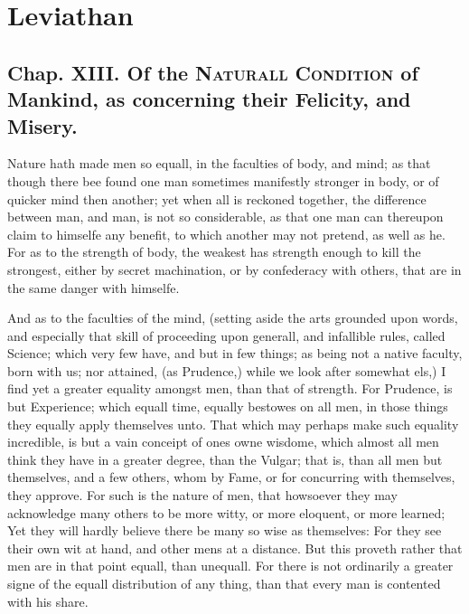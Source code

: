 
\author{Thomas Hobbes}
\chapter[Leviathan, chaps. 13 and 17]{Leviathan}

\section{Chap. XIII. Of the \textsc{Naturall Condition} of
Mankind, as concerning their Felicity, and Misery.}

Nature hath made men so equall, in the faculties of body, and mind; as
that though there bee found one man sometimes manifestly stronger in
body, or of quicker mind then another; yet when all is reckoned
together, the difference between man, and man, is not so considerable,
as that one man can thereupon claim to himselfe any benefit, to which
another may not pretend, as well as he. For as to the strength of
body, the weakest has strength enough to kill the strongest, either by
secret machination, or by confederacy with others, that are in the
same danger with himselfe.

And as to the faculties of the mind, (setting aside the arts
grounded upon words, and especially that skill of proceeding upon
generall, and infallible rules, called Science; which very few have,
and but in few things; as being not a native faculty, born with us;
nor attained, (as Prudence,) while we look after somewhat els,) I find
yet a greater equality amongst men, than that of strength. For
Prudence, is but Experience; which equall time, equally bestowes on
all men, in those things they equally apply themselves unto. That
which may perhaps make such equality incredible, is but a vain
conceipt of ones owne wisdome, which almost all men think they have
in a greater degree, than the Vulgar; that is, than all men but
themselves, and a few others, whom by Fame, or for concurring with
themselves, they approve. For such is the nature of men, that
howsoever they may acknowledge many others to be more witty, or more
eloquent, or more learned; Yet they will hardly believe there be many
so wise as themselves: For they see their own wit at hand, and other
mens at a distance. But this proveth rather that men are in that
point equall, than unequall. For there is not ordinarily a greater
signe of the equall distribution of any thing, than that every man is
contented with his share.

